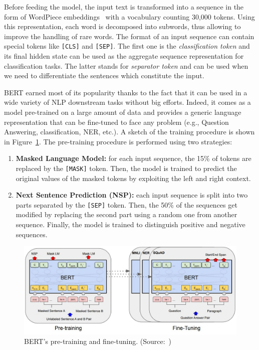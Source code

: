 Before feeding the model, the input text is transformed into a sequence in the form of WordPiece embeddings~\cite{wordpiece} with a vocabulary counting 30,000 tokens. Using this representation, each word is decomposed into subwords, thus allowing to improve the handling of rare words. The format of an input sequence can contain special tokens like \verb|[CLS]| and \verb|[SEP]|. The first one is the \textit{classification token} and its final hidden state can be used as the aggregate sequence representation for classification tasks. The latter stands for \textit{separator token} and can be used when we need to differentiate the sentences which constitute the input. 

BERT earned most of its popularity thanks to the fact that it can be used in a wide variety of NLP downstream tasks without big efforts. Indeed, it comes as a model pre-trained on a large amount of data and provides a generic language representation that can be fine-tuned to face any problem (e.g., Question Answering, classification, NER, etc.). A sketch of the training procedure is shown in Figure~\ref{fig:bert_training}. The pre-training procedure is performed using two strategies:
\begin{enumerate}
    \item \textbf{Masked Language Model:} for each input sequence, the 15\% of tokens are replaced by the \verb|[MASK]| token. Then, the model is trained to predict the original values of the masked tokens by exploiting the left and right context.
    \item \textbf{Next Sentence Prediction (NSP):} each input sequence is split into two parts separated by the \verb|[SEP]| token. Then, the 50\% of the sequences get modified by replacing the second part using a random one from another sequence. Finally, the model is trained to distinguish positive and negative sequences.
\end{enumerate}

\begin{figure}[H]
    \centering
    \centerline{\includegraphics[scale=.5]{figures/bert_training.JPG}}
    \caption{BERT's pre-training and fine-tuning. (Source:~\cite{devlin-etal-2019-bert})}
    \label{fig:bert_training}
\end{figure}

